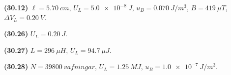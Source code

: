 \ifdefined \wholebook \else\documentclass[oneside]{book}\usepackage{EdlBook}\graphicspath{{figures/}}
\begin{document}
\begin{enumerate}[label = \textbf{(\alph*)}]
\end{enumerate}


\begin{tcolorbox}
\begin{enumerate*}[label = ]
  \item \textbf{(30.12)} $\ell = \SI{5.70}{cm}$, $U_L = \SI{5.0e-8}{J}$, $u_B = \SI{0.070}{J/m^3}$, $B = \SI{419}{\mu T}$, $\Delta V_L = \SI{0.20}{V}$.
  \item \textbf{(30.26)} $U_L = \SI{0.20}{J}$.
  \item \textbf{(30.27)} $L = \SI{296}{\mu H}$, $U_L = \SI{94.7}{\mu J}$.
  \item \textbf{(30.28)} $N = \SI{39800}{vafningar}$, $U_L = \SI{1.25}{MJ}$, $u_B = \SI{1.0e-7}{J/m^3}$.
\end{enumerate*}
\end{tcolorbox}

\newpage

\ifdefined \wholebook \else
 \printindex
\end{document}
